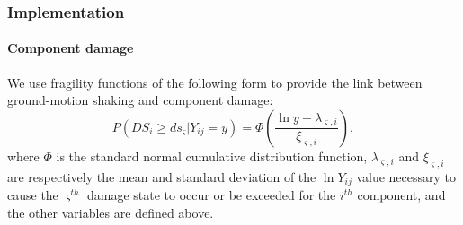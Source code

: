 \subsubsection{Implementation}
\paragraph{Component damage}


We use fragility functions of the following form to provide the link between ground-motion shaking and component damage:
\begin{equation}
P(DS_i \geq ds_\varsigma |Y_{ij} = y) = \Phi \left( \frac{\ln y - \lambda_{\varsigma, i}}{\xi_{\varsigma,i}} \right),
\label{eq:dsfull}
\end{equation}
where $\Phi$ is the standard normal cumulative distribution function, $\lambda_{\varsigma,i}$ and $\xi_{\varsigma,i}$ are respectively the mean and standard deviation of the $\ln Y_{ij}$ value necessary to cause the $\varsigma^{th}$ damage state to occur or be exceeded for the $i^{th}$ component, and the other variables are defined above. 
%
%

